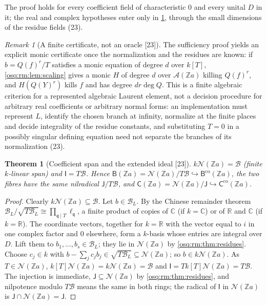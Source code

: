 \documentclass[11pt,letterpaper]{article}
\numberwithin{equation}{section}
\newtheorem{theorem}{Theorem}[section]
\theoremstyle{definition}
\theoremstyle{remark}
\newtheorem{remark}[remark]{Remark}
\theoremstyle{plain}
\newcommand{\Z}{\mathbb Z}
\newcommand{\R}{\mathbb R}
\newcommand{\C}{\mathbb C}
\newcommand{\A}{\mathcal A}          %
\newcommand{\NN}{\mathcal N}         %
\newcommand{\src}[1]{\textup{\textsf{[#1]}}}
\begin{document}
The proof holds for every coefficient field of characteristic $0$ and every unital $D$ in it; the real and complex hypotheses enter only in
\cref{osq:rm:thm:span}, through the small dimensions of the residue fields (23).

\begin{remark}[A finite certificate, not an oracle \src{23}]\label{osq:rm:rem:effective}
The sufficiency proof yields an explicit monic certificate once the normalization and the residues are known: if $b=Q(f)^r/T$ satisfies a monic
equation of degree $d$ over $k[T]$, \cref{osq:rm:lem:scaling} gives a monic $H$ of degree $d$ over $\A(\Z a)$ killing $Q(f)^r$, and $H(Q(Y)^r)$ kills $f$
and has degree $dr\deg Q$. This is a finite algebraic criterion for a represented algebraic Laurent element, not a decision procedure for arbitrary
real coefficients or arbitrary normal forms: an implementation must represent $L$, identify the chosen branch at infinity, normalize at the finite
places and decide integrality of the residue constants, and substituting $T=0$ in a possibly singular defining equation need not separate the
branches of its normalization (23).
\end{remark}

\begin{theorem}[Coefficient span and the extended ideal \src{23}]\label{osq:rm:thm:span}
$k\NN(\Z a)=\mathscr B$ (finite $k$-linear span) and $\mathsf I=T\mathscr B$. Hence $\mathsf B(\Z a)=\NN(\Z a)/T\mathscr B\hookrightarrow\mathsf B^{\mathrm{co}}(\Z a)$,
the two fibres have the same nilradical $\mathsf J/T\mathscr B$, and $\mathsf C(\Z a)=\NN(\Z a)/\mathsf J\hookrightarrow\mathsf C^{\mathrm{co}}(\Z a)$.
\end{theorem}
\begin{proof}
Clearly $k\NN(\Z a)\subseteq\mathscr B$. Let $b\in\mathscr B_L$. By the Chinese remainder theorem $\mathscr B_L/\sqrt{T\mathscr B_L}\cong\prod_{\mathfrak q\mid T}\ell_{\mathfrak q}$,
a finite product of copies of $\C$ (if $k=\C$) or of $\R$ and $\C$ (if $k=\R$). The coordinate vectors, together for $k=\R$ with the vector equal to
$i$ in one complex factor and $0$ elsewhere, form a $k$-basis whose entries are integral over $D$. Lift them to $b_1,\dots,b_s\in\mathscr B_L$; they lie in
$\NN(\Z a)$ by \cref{osq:rm:thm:residues}. Choose $c_j\in k$ with $b-\sum_jc_jb_j\in\sqrt{T\mathscr B_L}\subseteq\NN(\Z a)$; so $b\in k\NN(\Z a)$. As $T\in\NN(\Z a)$,
$k[T]\NN(\Z a)=k\NN(\Z a)=\mathscr B$ and $\mathsf I=Tk[T]\NN(\Z a)=T\mathscr B$. The injection is immediate, $\mathsf J\subseteq\NN(\Z a)$ by
\cref{osq:rm:thm:residues}, and nilpotence modulo $T\mathscr B$ means the same in both rings; the radical of $\mathsf I$ in $\NN(\Z a)$ is $\mathsf J\cap\NN(\Z a)=\mathsf J$.
\end{proof}
\end{document}
